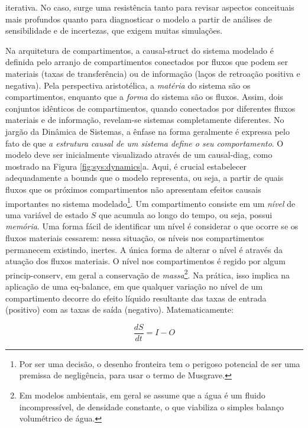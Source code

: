 \documentclass[./main.tex]{subfiles}
\begin{document}
iterativa. No caso, surge uma resistência tanto para revisar aspectos conceituais mais profundos quanto para diagnosticar o modelo a partir de análises de sensibilidade e de incertezas, que exigem muitas simulações.

\par Na arquitetura de compartimentos, a \gls{causal-struct} do sistema modelado é definida pelo arranjo de compartimentos conectados por fluxos que podem ser materiais (taxas de transferência) ou de informação (laços de retroação positiva e negativa). Pela perspectiva aristotélica, a \textit{matéria} do sistema são os compartimentos, enquanto que a \textit{forma} do sistema são os fluxos. Assim, dois conjuntos idênticos de compartimentos, quando conectados por diferentes fluxos materiais e de informação, revelam-se sistemas completamente diferentes. No jargão da Dinâmica de Sistemas, a ênfase na forma geralmente é expressa pelo fato de que \textit{a estrutura causal de um sistema define o seu comportamento}. O modelo deve ser inicialmente visualizado através de um \gls{causal-diag}, como mostrado na Figura \ref{fig:sys:dynamics}a. Aqui, é crucial estabelecer adequadamente a \gls{bounds} que o modelo representa, ou seja, a partir de quais fluxos que os próximos compartimentos não apresentam efeitos causais importantes no sistema modelado\footnote{Por ser uma decisão, o desenho fronteira tem o perigoso potencial de ser uma premissa de negligência, para usar o termo de Musgrave.}. Um compartimento consiste em um \textit{nível} de uma variável de estado $S$ que acumula ao longo do tempo, ou seja, possui \textit{memória}. Uma forma fácil de identificar um nível é considerar o que ocorre se os fluxos materiais cessarem: nessa situação, os níveis nos compartimentos permanecem existindo, inertes. A única forma de alterar o nível é através da atuação dos fluxos materiais. O nível nos compartimentos é regido por algum \gls{princip-conserv}, em geral a conservação de \textit{massa}\footnote{Em modelos ambientais, em geral se assume que a água é um fluido incompressível, de densidade constante, o que viabiliza o simples balanço volumétrico de água.}. Na prática, isso implica na aplicação de uma \gls{eq-balance}, em que qualquer variação no nível de um compartimento decorre do efeito líquido resultante das taxas de entrada (positivo) com as taxas de saída (negativo). Matematicamente:
\begin{linenomath*}
\begin{equation}
\label{eq:balance}
\frac{dS}{dt} = I - O 
\end{equation}
\end{linenomath*}
\end{document}
